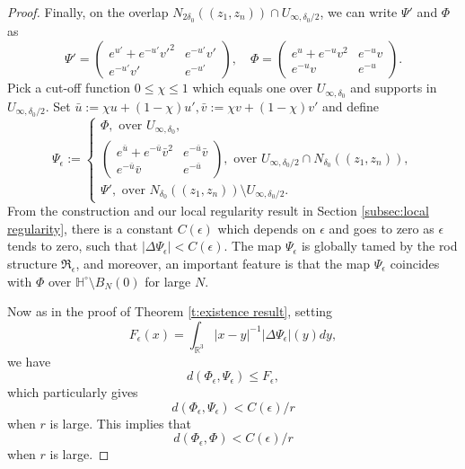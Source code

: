 \documentclass[a4paper,11pt]{amsart}
\theoremstyle{definition}
\numberwithin{equation}{section}
\newcommand{\mR} {\mathfrak R}
\begin{document}
\begin{proof}
    
    Finally, on the overlap $N_{2\delta_0}((z_1,z_n))\cap U_{\infty,\delta_0/2}$, we can write $\Psi'$ and $\Phi$ as 
    $$\Psi'=\left(\begin{matrix}
        e^{u'}+e^{-u'}v'^2 & e^{-u'}v' \\ e^{-u'}v' & e^{-u'}
    \end{matrix}\right),\quad \Phi=\left(\begin{matrix}
        e^{u}+e^{-u}v^2 & e^{-u}v \\ e^{-u}v & e^{-u}
    \end{matrix}\right).$$
    Pick a cut-off function $0\leq\chi\leq1$ which equals one over $U_{\infty,\delta_0}$ and supports in $U_{\infty,\delta_0/2}$. Set $\bar u:=\chi u+(1-\chi)u',\bar v:=\chi v+(1-\chi)v'$ and define
    $$\Psi_\epsilon:=\begin{cases}
        \Phi,\text{ over }U_{\infty,\delta_0},\\
        \left(\begin{matrix}
        e^{\bar u}+e^{-\bar u}\bar v^2 & e^{-\bar u}\bar v \\ e^{-\bar u}\bar v & e^{-\bar u}
    \end{matrix}\right), \text{ over } U_{\infty,\delta_0/2}\cap N_{\delta_0}((z_1,z_n)),\\
    \Psi', \text{ over }N_{\delta_0}((z_1,z_n))\setminus U_{\infty,\delta_0/2}.
    \end{cases}$$
    From the construction and our local regularity result in Section \ref{subsec:local regularity}, there is a constant $C(\epsilon)$ which depends on $\epsilon$ and goes to zero as $\epsilon$ tends to zero, such that $|\Delta\Psi_\epsilon|<C(\epsilon)$. The map $\Psi_\epsilon$ is globally tamed by the rod structure $\mR_\epsilon$, and moreover, an important feature is that the map $\Psi_\epsilon$ coincides with $\Phi$ over $\mathbb{H}^\circ\setminus B_N(0)$ for large $N$.



    Now as in the proof of Theorem \ref{t:existence result}, setting $$F_\epsilon(x)=\int_{\mathbb{R}^3}|x-y|^{-1}|\Delta\Psi_{\epsilon}|(y)dy,$$ we have $$d(\Phi_\epsilon,\Psi_\epsilon)\leq F_\epsilon,$$
    which particularly gives $$d(\Phi_\epsilon,\Psi_\epsilon)<C(\epsilon)/r$$ when $r$ is large. This implies that $$d(\Phi_\epsilon,\Phi)<C(\epsilon)/r$$ when $r$ is large.
\end{proof}
\end{document}
